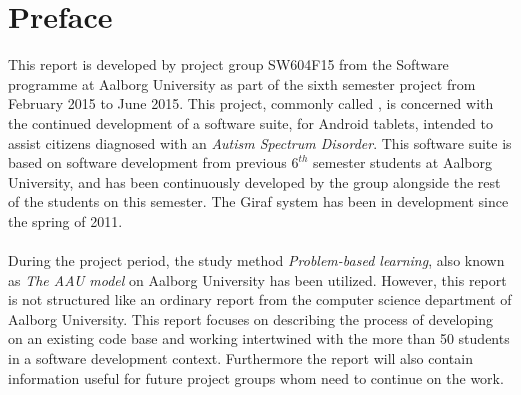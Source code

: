 
\chapter*{Preface}

This report is developed by project group SW604F15 from the Software programme at Aalborg University as part of the sixth semester project from February 2015 to June 2015. This project, commonly called \giraf, is concerned with the continued development of a software suite, for Android tablets, intended to assist citizens diagnosed with an \emph{Autism Spectrum Disorder}. This software suite is based on software development from previous $6^{th}$ semester students at Aalborg University, and has been continuously developed by the group alongside the rest of the students on this semester. The Giraf system has been in development since the spring of 2011.
\\\\
During the project period, the study method \emph{Problem-based learning}, also known as \emph{The AAU model} on Aalborg University has been utilized. However, this report is not structured like an ordinary report from the computer science department of Aalborg University. This report focuses on describing the process of developing on an existing code base and working intertwined with the more than 50 students in a software development context. Furthermore the report will also contain information useful for future project groups whom need to continue on the work.

